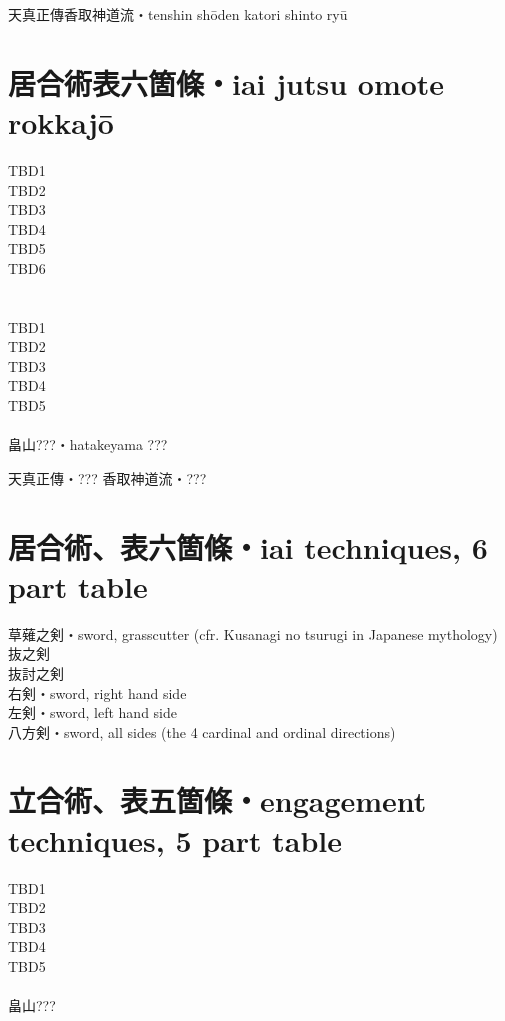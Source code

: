 \documentclass[dvipdfmx, a4paper, 12pt]{utarticle}
\begin{document}
\begin{CJK*}{UTF8}{min}
\begin{landscape}
\setcounter{section}{0}
\newpage
\pagestyle{empty}
天真正傳香取神道流・tenshin sh\={o}den katori shinto ry\={u}
\section{居合術表六箇條・iai jutsu omote rokkaj\={o}}
\noindent TBD1\\
TBD2\\
TBD3\\
TBD4\\
TBD5\\
TBD6\\
\section{}
\noindent TBD1\\
TBD2\\
TBD3\\
TBD4\\
TBD5\\
\\
畠山???・hatakeyama ???

\setcounter{section}{0}
\newpage
\pagestyle{empty}
天真正傳・???
香取神道流・???
\section{居合術、表六箇條・iai techniques, 6 part table}
\noindent 草薙之剣・sword, grasscutter (cfr. Kusanagi no tsurugi in Japanese mythology)\\
抜之剣\\
抜討之剣\\
右剣・sword, right hand side\\
左剣・sword, left hand side\\
八方剣・sword, all sides (the 4 cardinal and ordinal directions)\\
\section{立合術、表五箇條・engagement techniques, 5 part table}
\noindent TBD1\\
TBD2\\
TBD3\\
TBD4\\
TBD5\\
\\
畠山???



\end{landscape}
\end{CJK*}
\end{document}
